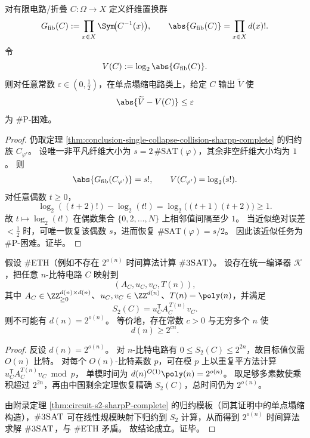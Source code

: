 \begin{theorem}\label{thm:conclusion-fiber-permutation-logvolume-constant-error-sharpp-hard}
对有限电路/折叠 \(C:\Omega\to X\) 定义纤维置换群
\[
G_{\mathrm{fib}}(C):=\prod_{x\in X}\Sym\!\bigl(C^{-1}(x)\bigr),
\qquad
\abs{G_{\mathrm{fib}}(C)}=\prod_{x\in X} d(x)!.
\]
令
\[
V(C):=\log_2\abs{G_{\mathrm{fib}}(C)}.
\]
则对任意常数 \(\varepsilon\in(0,\frac12)\)，在单点塌缩电路类上，给定 \(C\) 输出 \(\widetilde V\) 使
\[
\abs{\widetilde V-V(C)}\le \varepsilon
\]
为 \(\#\mathrm P\)-困难。
\end{theorem}
\begin{proof}
仍取定理 \ref{thm:conclusion-single-collapse-collision-sharpp-complete} 的归约族 \(C_{\varphi'}\)。
设唯一非平凡纤维大小为 \(s=2\,\#\mathrm{SAT}(\varphi)\)，其余非空纤维大小均为 \(1\)。
则
\[
\abs{G_{\mathrm{fib}}(C_{\varphi'})}=s!,
\qquad
V(C_{\varphi'})=\log_2(s!).
\]
对任意偶数 \(t\ge 0\)，
\[
\log_2((t+2)!)-\log_2(t!)=\log_2\!\bigl((t+1)(t+2)\bigr)\ge 1.
\]
故 \(t\mapsto\log_2(t!)\) 在偶数集合 \(\{0,2,\dots,N\}\) 上相邻值间隔至少 \(1\)。
当近似绝对误差 \(<\frac12\) 时，可唯一恢复该偶数 \(s\)，进而恢复 \(\#\mathrm{SAT}(\varphi)=s/2\)。
因此该近似任务为 \(\#\mathrm P\)-困难。证毕。
\end{proof}

\begin{corollary}\label{cor:conclusion-collision-kernel-matrix-power-exp-dimension-under-sharpeth}
假设 \(\#\)ETH（例如不存在 \(2^{o(n)}\) 时间算法计算 \(\#\text{\normalfont\textsc{3SAT}}\)）。
设存在统一编译器 \(\mathcal K\)，把任意 \(n\)-比特电路 \(C\) 映射到
\[
(A_C,u_C,v_C,T(n)),
\]
其中 \(A_C\in\ZZ_{\ge 0}^{d(n)\times d(n)}\)、\(u_C,v_C\in\ZZ^{d(n)}\)、\(T(n)=\poly(n)\)，并满足
\[
S_2(C)=u_C^{\mathsf T}A_C^{\,T(n)}v_C.
\]
则不可能有 \(d(n)=2^{o(n)}\)。
等价地，存在常数 \(c>0\) 与无穷多个 \(n\) 使
\[
d(n)\ge 2^{cn}.
\]
\end{corollary}
\begin{proof}
反设 \(d(n)=2^{o(n)}\)。
对 \(n\)-比特电路有 \(0\le S_2(C)\le 2^{2n}\)，故目标值仅需 \(O(n)\) 比特。
对每个 \(O(n)\)-比特素数 \(p\)，可在模 \(p\) 上以重复平方法计算
\(
u_C^{\mathsf T}A_C^{T(n)}v_C\bmod p
\)，
单模时间为 \(d(n)^{O(1)}\poly(n)=2^{o(n)}\)。
取足够多素数使乘积超过 \(2^{2n}\)，再由中国剩余定理恢复精确 \(S_2(C)\)，总时间仍为 \(2^{o(n)}\)。

由附录定理 \ref{thm:circuit-s2-sharpP-complete} 的归约模板（同其证明中的单点塌缩构造），\(\#\textsc{3SAT}\) 可在线性规模映射下归约到 \(S_2\) 计算，从而得到 \(2^{o(n)}\) 时间算法求解 \(\#\textsc{3SAT}\)，与 \(\#\)ETH 矛盾。
故结论成立。证毕。
\end{proof}

